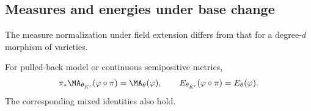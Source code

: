 \subsection{Measures and energies under base change}
\label{sec:ch30-bc-measures}

The measure normalization under field extension differs from that for a
degree-\(d\) morphism of varieties.

\begin{theorem}\label{thm:base-change-ma}
For pulled-back model or continuous semipositive metrics,
\begin{equation}
\label{eq:base-change-ma}
 \pi_*\MA_{\theta_{K'}}(\varphi\circ\pi)=\MA_\theta(\varphi),
 \qquad
 E_{\theta_{K'}}(\varphi\circ\pi)=E_\theta(\varphi).
\end{equation}
The corresponding mixed identities also hold.
\end{theorem}

